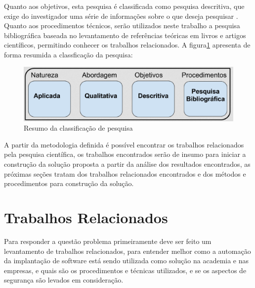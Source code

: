 Quanto aos objetivos, esta pesquisa é classificada como pesquisa descritiva, que
exige do investigador uma série de informações sobre o que deseja pesquisar
\cite{trivinos1987introduccao}. Quanto aos procedimentos técnicos, serão utilizados
neste trabalho a pesquisa bibliográfica baseada no levantamento de referências
teóricas em livros e artigos científicos, permitindo conhecer os trabalhos
relacionados. A figura\ref{fig:metodologia1} apresenta de forma resumida a classficação
da pesquisa:

\begin{figure}[h]
  \centering
  \includegraphics[width=1.0\textwidth]
      {figuras/met1.eps}
  \caption{Resumo da classificação de pesquisa}
\label{fig:metodologia1}
\end{figure}

%
A partir da metodologia definida é possível encontrar os trabalhos relacionados
pela pesquisa científica, os trabalhos encontrados serão de insumo para iniciar
a construção da solução proposta a partir da análise dos resultados encontrados,
as próximas seções tratam dos trabalhos relacionados encontrados e dos métodos e
procedimentos para construção da solução.

\section{Trabalhos Relacionados}
\label{section:trabalhos_relacionados}
Para responder a questão problema primeiramente deve ser feito um levantamento
de trabalhos relacionados, para entender melhor como a automação da implantação
de software está sendo utilizada como solução na academia e nas empresas, e
quais são os procedimentos e técnicas utilizados, e se os aspectos de segurança
são levados em consideração.

